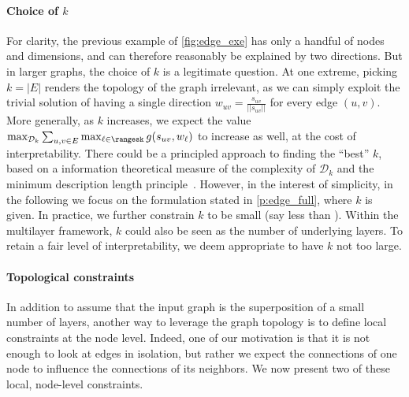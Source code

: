 \paragraph{Choice of $k$}
\label{par:edge_choose_k}

For clarity, the previous example of \autoref{fig:edge_exe} has only a handful of nodes and
dimensions, and can therefore reasonably be explained by two directions. But in larger graphs, the
choice of $k$ is a legitimate question.
At one extreme, picking $k=|E|$ renders the topology of the graph
irrelevant, as we can simply exploit the trivial
solution of having a single direction $w_{uv} = \frac{s_{uv}}{||s_{uv}||}$ for every edge $(u,v)$.
More generally, as $k$ increases, we expect the value $\max_{\mathcal{D}_k} \sum_{u,v \in E}
\max_{\ell \in \rangesk} g(s_{uv}, w_{\ell})$ to increase as
well, at the cost of interpretability. There could be a principled approach to finding the
\enquote{best} $k$, based on a information theoretical measure of the complexity of $\mathcal{D}_k$
and the minimum description length principle~\autocite{grunwald2005tutorial}. However, in the
interest of simplicity, in the following we focus on the formulation stated in
\autoref{p:edge_full}, where $k$ is given. In practice, we further constrain $k$ to be small (say
less than ). Within the multilayer framework, $k$ could also be seen as the number of
underlying layers. To retain a fair level of interpretability, we deem appropriate to have $k$ not
too large.

\paragraph{Topological constraints}

In addition to assume that the input graph is the superposition of a small number of layers,
another way to leverage the graph topology is to define local constraints at the node level.
Indeed, one of our motivation is that it is not enough to look at edges in isolation, but rather we
expect the connections of one node to influence the connections of its neighbors. We now present two
of these local, node-level constraints. 

